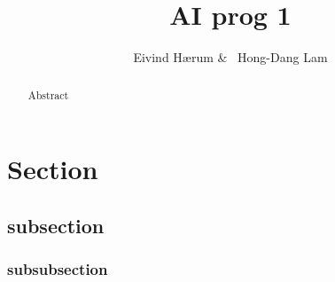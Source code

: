 \documentclass[12pt, a4paper]{article}
\title{AI prog 1}
\author{Eivind Hærum \& \ Hong-Dang Lam}
\begin{document}
\maketitle
\begin{abstract}
 
Abstract
 
\end{abstract}
 
\newpage
\tableofcontents
\newpage
 
\section{Section}
\subsection{subsection}
\subsubsection{subsubsection}
 
\end{document}

